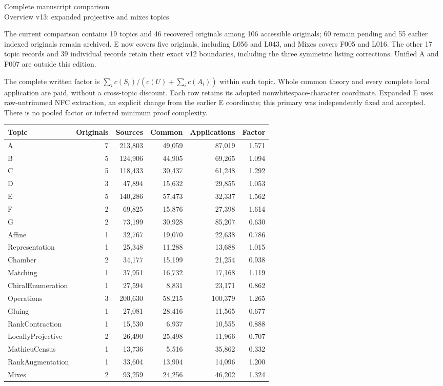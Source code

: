 \documentclass[11pt,a4paper]{article}
\begin{document}
\begin{center}{\Large Complete manuscript comparison}\\[3pt]
Overview v13: expanded projective and mixes topics\end{center}
The current comparison contains 19 topics and 46 recovered originals among 106 accessible originals; 60 remain pending and 55 earlier indexed originals remain archived. E now covers five originals, including L056 and L043, and Mixes covers F005 and L016. The other 17 topic records and 39 individual records retain their exact v12 boundaries, including the three symmetric listing corrections. Unified A and F007 are outside this edition.

The complete written factor is $\sum_i c(S_i)/(c(U)+\sum_i c(A_i))$ within each topic. Whole common theory and every complete local application are paid, without a cross-topic discount. Each row retains its adopted nonwhitespace-character coordinate. Expanded E uses raw-untrimmed NFC extraction, an explicit change from the earlier E coordinate; this primary was independently fixed and accepted. There is no pooled factor or inferred minimum proof complexity.
\begin{center}\small\begin{tabular}{lrrrrr}\toprule
Topic & Originals & Sources & Common & Applications & Factor\\\midrule
A & 7 & 213,803 & 49,059 & 87,019 & 1.571 \\
B & 5 & 124,906 & 44,905 & 69,265 & 1.094 \\
C & 5 & 118,433 & 30,437 & 61,248 & 1.292 \\
D & 3 & 47,894 & 15,632 & 29,855 & 1.053 \\
E & 5 & 140,286 & 57,473 & 32,337 & 1.562 \\
F & 2 & 69,825 & 15,876 & 27,398 & 1.614 \\
G & 2 & 73,199 & 30,928 & 85,207 & 0.630 \\
Affine & 1 & 32,767 & 19,070 & 22,638 & 0.786 \\
Representation & 1 & 25,348 & 11,288 & 13,688 & 1.015 \\
Chamber & 2 & 34,177 & 15,199 & 21,254 & 0.938 \\
Matching & 1 & 37,951 & 16,732 & 17,168 & 1.119 \\
ChiralEnumeration & 1 & 27,594 & 8,831 & 23,171 & 0.862 \\
Operations & 3 & 200,630 & 58,215 & 100,379 & 1.265 \\
Gluing & 1 & 27,081 & 28,416 & 11,565 & 0.677 \\
RankContraction & 1 & 15,530 & 6,937 & 10,555 & 0.888 \\
LocallyProjective & 2 & 26,490 & 25,498 & 11,966 & 0.707 \\
MathieuCensus & 1 & 13,736 & 5,516 & 35,862 & 0.332 \\
RankAugmentation & 1 & 33,604 & 13,904 & 14,096 & 1.200 \\
Mixes & 2 & 93,259 & 24,256 & 46,202 & 1.324 \\
\bottomrule\end{tabular}\end{center}
\end{document}
